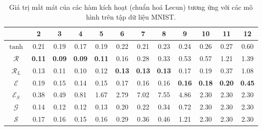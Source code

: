 \begin{table}[ht!]
\centering
\def\arraystretch{1.3}
\begin{tabular}{c|c|c|c|c|c|c|c|c|c|c|c|}
\cline{2-12}
                        & 2    & 3    & 4    & 5    & 6    & 7    & 8    & 9    & 10   & 11   & 12   \\ \hline
\multicolumn{1}{|c|}{$\tanh$} & 0.21 & 0.19 & 0.17 & 0.19 & 0.22 & 0.21 & 0.23 & 0.24 & 0.26 & 0.27 & 0.60  \\ \hline
\multicolumn{1}{|c|}{$\mathcal{R}$} & \textbf{0.11} & \textbf{0.09} & \textbf{0.09} & \textbf{0.11} & 0.16 & 0.28 & 0.33 & 0.53 & 0.57 & 1.21 & 1.39 \\ \hline
\multicolumn{1}{|c|}{$\mathcal{R}_L$} & 0.13 & 0.11 & 0.10 & 0.12 & \textbf{0.13} & \textbf{0.13} & \textbf{0.13} & 0.17 & 0.19 & 0.37 & 1.08 \\ \hline
\multicolumn{1}{|c|}{$\mathcal{E}$} & 0.19 & 0.15 & 0.14 & 0.15 & 0.17 & 0.16 & 0.16 & \textbf{0.16} & \textbf{0.18} & \textbf{0.20} & \textbf{0.45} \\ \hline
\multicolumn{1}{|c|}{$\mathcal{E}_S$} & 0.38 & 0.49 & 0.81 & 1.67 & 2.79 & 7.02 & 7.55 & 4.86 & 2.30  & 2.30  & 2.30  \\ \hline
\multicolumn{1}{|c|}{$\mathcal{G}$} & 0.14 & 0.12 & 0.12 & 0.13 & 0.20 & 0.22 & 0.34 & 0.72 & 2.30  & 2.30  & 2.30  \\ \hline
\multicolumn{1}{|c|}{$\mathcal{S}$} & 0.17 & 0.16 & 0.15 & 0.16 & 0.29 & 0.36 & 0.46 & 1.21 & 2.30  & 2.30  & 2.30  \\ \hline
\end{tabular}
\caption{Giá trị mất mát của các hàm kích hoạt (chuẩn hoá Lecun) tương ứng với các mô hình trên tập dữ liệu MNIST.}
\label{tab:mnistdloss}
\end{table}


